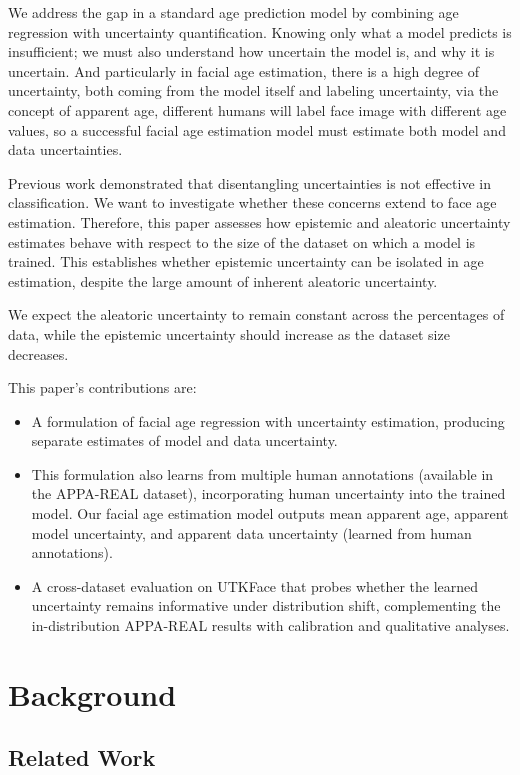 \documentclass[runningheads]{llncs}
\begin{document}
We address the gap in a standard age prediction model by combining age regression with uncertainty quantification. Knowing only what a model predicts is insufficient; we must also understand how uncertain the model is, and why it is uncertain. And particularly in facial age estimation, there is a high degree of uncertainty, both coming from the model itself and labeling uncertainty, via the concept of apparent age, different humans will label face image with different age values, so a successful facial age estimation model must estimate both model and data uncertainties.

Previous work demonstrated that disentangling uncertainties is not effective in classification. We want to investigate whether these concerns extend to face age estimation. Therefore, this paper assesses how epistemic and aleatoric uncertainty estimates behave with respect to the size of the dataset on which a model is trained. This establishes whether epistemic uncertainty can be isolated in age estimation, despite the large amount of inherent aleatoric uncertainty.

We expect the aleatoric uncertainty to remain constant across the percentages of data, while the epistemic uncertainty should increase as the dataset size decreases.

This paper's contributions are:
\begin{itemize}
    \item A formulation of facial age regression with uncertainty estimation, producing separate estimates of model and data uncertainty.
    \item This formulation also learns from multiple human annotations (available in the APPA-REAL dataset), incorporating human uncertainty into the trained model. Our facial age estimation model outputs mean apparent age, apparent model uncertainty, and apparent data uncertainty (learned from human annotations).
    \item A cross-dataset evaluation on UTKFace that probes whether the learned uncertainty remains informative under distribution shift, complementing the in-distribution APPA-REAL results with calibration and qualitative analyses.
\end{itemize}

\section{Background}
\label{sec:background}

\subsection{Related Work}
\end{document}
